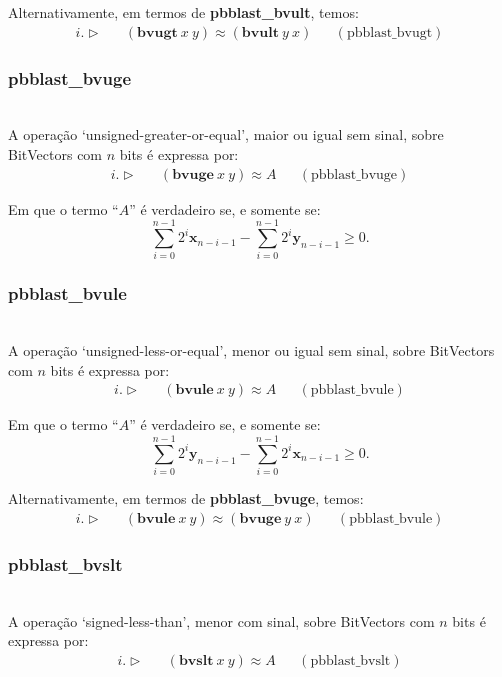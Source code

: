 \documentclass[conference]{IEEEtran}
\begin{document}
Alternativamente, em termos de \textbf{pbblast\_bvult}, temos:
\begin{align*}
    i. \vartriangleright &  & (\textbf{bvugt}\ x\ y) \approx (\textbf{bvult}\ y\ x) &  & (\text{pbblast\_bvugt})
\end{align*}

\subsubsection{\textbf{pbblast\_bvuge}}
\noindent\\
A operação `unsigned-greater-or-equal', maior ou igual sem sinal, sobre BitVectors com $n$ bits é expressa por:
\begin{align*}
    i. \vartriangleright &  & (\textbf{bvuge}\ x\ y) \approx A &  & (\text{pbblast\_bvuge})
\end{align*}

Em que o termo ``$A$'' é verdadeiro se, e somente se:
\[
    \sum_{i=0}^{n-1} 2^i\mathbf{x}_{n-i-1} - \sum_{i=0}^{n-1} 2^i\mathbf{y}_{n-i-1} \ge 0.
\]

\subsubsection{\textbf{pbblast\_bvule}}
\noindent\\
A operação `unsigned-less-or-equal', menor ou igual sem sinal, sobre BitVectors com $n$ bits é expressa por:
\begin{align*}
    i. \vartriangleright &  & (\textbf{bvule}\ x\ y) \approx A &  & (\text{pbblast\_bvule})
\end{align*}

Em que o termo ``$A$'' é verdadeiro se, e somente se:
\[
    \sum_{i=0}^{n-1} 2^i\mathbf{y}_{n-i-1} - \sum_{i=0}^{n-1} 2^i\mathbf{x}_{n-i-1} \ge 0.
\]

Alternativamente, em termos de \textbf{pbblast\_bvuge}, temos:
\begin{align*}
    i. \vartriangleright &  & (\textbf{bvule}\ x\ y) \approx (\textbf{bvuge}\ y\ x) &  & (\text{pbblast\_bvule})
\end{align*}

\subsubsection{\textbf{pbblast\_bvslt}}
\noindent\\
A operação `signed-less-than', menor com sinal, sobre BitVectors com $n$ bits é expressa por:
\begin{align*}
    i. \vartriangleright &  & (\textbf{bvslt}\ x\ y) \approx A &  & (\text{pbblast\_bvslt})
\end{align*}
\end{document}
